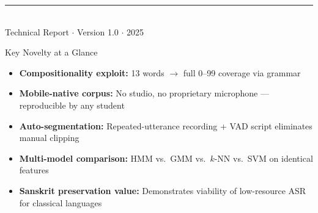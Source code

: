 \documentclass[12pt,a4paper]{article}
\begin{document}
\begin{titlepage}
  \vfill

  {\color{saffron}\rule{\textwidth}{2pt}}\\[0.3cm]
  {\small\color{gray} Technical Report $\cdot$ Version 1.0 $\cdot$ 2025}
\end{titlepage}

\tableofcontents
\newpage

\begin{abstract}
\noindent
\textbf{SankhyaVox} is a constrained automatic speech recognition (ASR) system
designed to recognise spoken Sanskrit numerals in the range 0--99
from a deliberately minimal recorded vocabulary of only \textbf{13 base words}.
The core thesis is that Sanskrit's inherent compositional morphology, in which
larger numbers are formed from smaller atomic units, can be exploited
to build a grammar-constrained Hidden Markov Model (HMM) pipeline that
\emph{generalises far beyond its training vocabulary} without requiring
additional data collection.

Data are collected from \textbf{10 or more speakers} using mobile phones in
quiet rooms, using a structured repeated-utterance protocol that enables
automated audio segmentation via energy-based silence detection.
Acoustic features consist of 39-dimensional MFCC vectors
($13 + \Delta + \Delta\Delta$).
Word-level left-to-right HMMs with Bakis topology are trained using
Baum-Welch (EM); inference uses Viterbi decoding constrained by a formal
context-free grammar over the digit vocabulary.

Baseline comparisons against GMM, $k$-NN, and SVM classifiers demonstrate the
advantage of temporal sequence modelling.
Under clean, controlled conditions, we target \textbf{90--96\% word accuracy}
on 0--99 with new unseen speakers.
The project contributes a novel mobile-recorded Sanskrit digit dataset,
a reusable automated segmentation pipeline, and a reproducible
grammar-constrained HMM baseline for low-resource ancient-language ASR.
\end{abstract}

\vspace{1cm}
\begin{keybox}{Key Novelty at a Glance}
\begin{itemize}[leftmargin=1.2em, itemsep=2pt]
  \item \textbf{Compositionality exploit:} 13 words $\to$ full 0--99 coverage via grammar
  \item \textbf{Mobile-native corpus:} No studio, no proprietary microphone --- reproducible by any student
  \item \textbf{Auto-segmentation:} Repeated-utterance recording + VAD script eliminates manual clipping
  \item \textbf{Multi-model comparison:} HMM vs.\ GMM vs.\ $k$-NN vs.\ SVM on identical features
  \item \textbf{Sanskrit preservation value:} Demonstrates viability of low-resource ASR for classical languages
\end{itemize}
\end{keybox}
\end{document}
